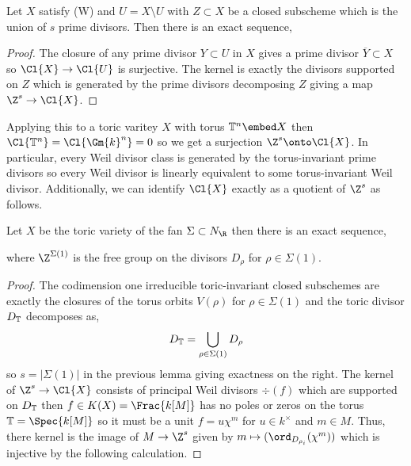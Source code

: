 \documentclass[12pt]{article}
\begin{document}
\begin{lemma}
Let $X$ satisfy (W) and $U = X \setminus U$ with $Z \subset X$ be a closed subscheme which is the union of $s$ prime divisors. Then there is an exact sequence,
\begin{center}
\end{center}
\end{lemma}

\begin{proof}
The closure of any prime divisor $Y \subset U$ in $X$ gives a prime divisor $\overline{Y} \subset X$ so $\Cl{X} \to \Cl{U}$ is surjective. The kernel is exactly the divisors supported on $Z$ which is generated by the prime divisors decomposing $Z$ giving a map $\Z^s \to \Cl{X}$.  
\end{proof}
\noindent
Applying this to a toric varitey $X$ with torus $\T^n \embed X$ then $\Cl{\T^n} = \Cl{\Gm{k}^n} = 0$ so we get a surjection $\Z^s \onto \Cl{X}$. In particular, every Weil divisor class is generated by the torus-invariant prime divisors so every Weil divisor is linearly equivalent to some torus-invariant Weil divisor. Additionally, we can identify $\Cl{X}$ exactly as a quotient of $\Z^s$ as follows. 

\begin{prop}
Let $X$ be the toric variety of the fan $\Sigma \subset N_\R$ then there is an exact sequence,
\begin{center}
\end{center}
where $\Z^{\Sigma(1)}$ is the free group on the divisors $D_\rho$ for $\rho \in \Sigma(1)$. 
\end{prop}

\begin{proof}
The codimension one irreducible toric-invariant closed subschemes are exactly the closures of the torus orbits $V(\rho)$ for $\rho \in \Sigma(1)$ and the toric divisor $D_{\mathbb{T}}$ decomposes as,
\[ D_{\mathbb{T}} = \bigcup_{\rho \in \Sigma(1)} D_\rho \]
so $s = |\Sigma(1)|$ in the previous lemma giving exactness on the right. The kernel of $\Z^s \to \Cl{X}$ consists of principal Weil divisors $\div{(f)}$ which are supported on $D_{\mathbb{T}}$ then $f \in K(X) = \Frac{k[M]}$ has no poles or zeros on the torus $\T = \Spec{k[M]}$ so it must be a unit $f = u \chi^m$ for $u \in k^\times$ and $m \in M$. Thus, there kernel is the image of $M \to \Z^s$ given by $m \mapsto (\ord_{D_{\rho_i}}(\chi^m))$ which is injective by the following calculation.
\end{proof}
\end{document}
